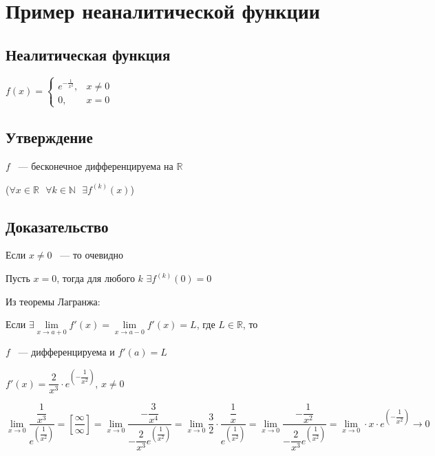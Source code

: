 \documentclass{article}
\begin{document}
	\newpage
	
	\section{Пример неаналитической функции}
	
		\subsection{Неалитическая функция}
		
			$f(x) = \begin{cases} e^{-\frac{1}{x^2}}, & x \neq 0 \\ 0, & x = 0 \end{cases}$
			
		\subsection{Утверждение}
		
			$f$ ~--- бесконечное дифференцируема на $\mathbb{R}$
			
			($\forall x \in \mathbb{R} \ \ \ \forall k \in \mathbb{N} \ \ \ \exists f^{(k)} (x)$)
			
		\subsection{Доказательство}
		
			Если $x \neq 0$ ~--- то очевидно
			
			Пусть $x = 0$, тогда для любого $k$ $\exists f^{(k)} (0) = 0$
			
			Из теоремы Лагранжа:
			
			Если $\exists \lim\limits_{x \rightarrow a + 0} f'(x) = \lim\limits_{x \rightarrow a - 0} f'(x) = L$, где $L \in \mathbb{R}$, то
			
			$f$ ~--- дифференцируема и $f'(a) = L$
			
			$f'(x) = \dfrac{2}{x^3} \cdot e^{\left(-\dfrac{1}{x^2}\right)}$, $x \neq 0$
			
			$\lim\limits_{x \rightarrow 0} \dfrac{\dfrac{1}{x^3}}{e^{\left(\dfrac{1}{x^2}\right)}} = \left[ \dfrac{\infty}{\infty} \right] = \lim\limits_{x \rightarrow 0} \dfrac{-\dfrac{3}{x^4}}{-\dfrac{2}{x^3} e^{\left(\dfrac{1}{x^2}\right)}} = \lim\limits_{x \rightarrow 0} \dfrac{3}{2} \cdot \dfrac{\dfrac{1}{x}}{e^{\left(\dfrac{1}{x^2}\right)}} = \lim\limits_{x \rightarrow 0} \dfrac{-\dfrac{1}{x^2}}{-\dfrac{2}{x^3} e^{\left(\dfrac{1}{x^2}\right)}} = \lim\limits_{x \rightarrow 0} \cdot x \cdot e^{\left(-\dfrac{1}{x^2}\right)} \rightarrow 0$
			
\end{document}
